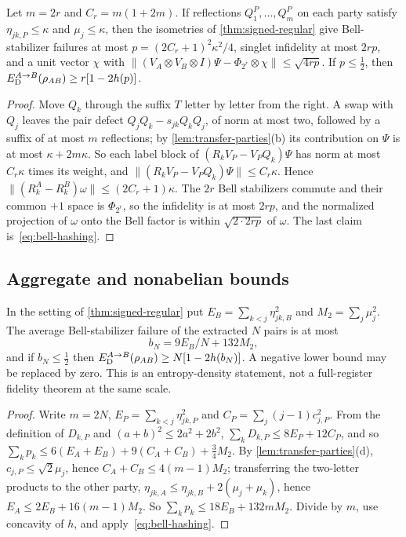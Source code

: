 \begin{lemma}\label{lem:fixed-size}
Let $m=2r$ and $C_r=m(1+2m)$. If reflections $Q^P_1,\dots,Q^P_m$ on each party satisfy $\eta_{jk,P}\le\kappa$ and
$\mu_j\le\kappa$, then the isometries of \cref{thm:signed-regular} give Bell-stabilizer failures at most
$p=(2C_r+1)^2\kappa^2/4$, singlet infidelity at most $2rp$, and a unit vector $\chi$ with
$\|(V_A\otimes V_B\otimes I)\Psi-\Phi_{2^r}\otimes\chi\|\le\sqrt{4rp}$. If $p\le\frac12$, then
$E_{\mathrm D}^{A\to B}(\rho_{AB})\ge r[1-2h(p)]$.
\end{lemma}

\begin{proof}
Move $Q_k$ through the suffix $T$ letter by letter from the right. A swap with $Q_j$ leaves the pair defect
$Q_jQ_k-s_{jk}Q_kQ_j$, of norm at most two, followed by a suffix of at most $m$ reflections; by
\cref{lem:transfer-parties}(b) its contribution on $\Psi$ is at most $\kappa+2m\kappa$. So each label block of
$(R_kV_P-V_PQ_k)\Psi$ has norm at most $C_r\kappa$ times its weight, and $\|(R_kV_P-V_PQ_k)\Psi\|\le C_r\kappa$. Hence
$\|(R^A_k-R^B_k)\omega\|\le(2C_r+1)\kappa$. The $2r$ Bell stabilizers commute and their common $+1$ space is
$\Phi_{2^r}$, so the infidelity is at most $2rp$, and the normalized projection of $\omega$ onto the Bell factor is within
$\sqrt{2\cdot2rp}$ of $\omega$. The last claim is~\eqref{eq:bell-hashing}.
\end{proof}

\subsection{Aggregate and nonabelian bounds}\label{sec:aggregate}

\begin{theorem}\label{thm:aggregate}
In the setting of \cref{thm:signed-regular} put $E_B=\sum_{k<j}\eta_{jk,B}^2$ and $M_2=\sum_j\mu_j^2$. The average
Bell-stabilizer failure of the extracted $N$ pairs is at most
\[
b_N=9E_B/N+132M_2,
\]
and if $b_N\le\frac12$ then $E_{\mathrm D}^{A\to B}(\rho_{AB})\ge N[1-2h(b_N)]$. A negative lower bound may be replaced by zero.
This is an entropy-density statement, not a full-register fidelity theorem at the same scale.
\end{theorem}

\begin{proof}
Write $m=2N$, $E_P=\sum_{k<j}\eta_{jk,P}^2$ and $C_P=\sum_j(j-1)c_{j,P}^2$. From the definition of $D_{k,P}$ and
$(a+b)^2\le2a^2+2b^2$, $\sum_kD_{k,P}\le8E_P+12C_P$, and so $\sum_kp_k\le6(E_A+E_B)+9(C_A+C_B)+\frac34M_2$. By
\cref{lem:transfer-parties}(d), $c_{j,P}\le\sqrt2\mu_j$, hence $C_A+C_B\le4(m-1)M_2$; transferring the two-letter products
to the other party, $\eta_{jk,A}\le\eta_{jk,B}+2(\mu_j+\mu_k)$, hence $E_A\le2E_B+16(m-1)M_2$. So $\sum_kp_k\le18E_B+132mM_2$.
Divide by $m$, use concavity of $h$, and apply~\eqref{eq:bell-hashing}.
\end{proof}

